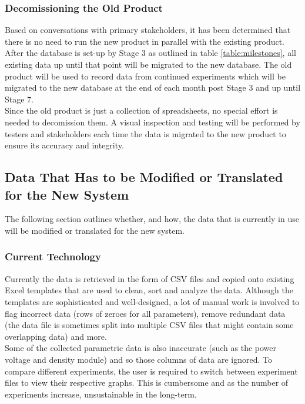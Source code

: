 \documentclass[12pt]{article}
\begin{document}
\subsubsection{Decomissioning the Old Product}
Based on conversations with primary stakeholders, it has been determined that there is no need to run the new product in parallel with the existing product. After the database is set-up
by Stage 3 as outlined in table \ref{table:milestones}, all existing data up until that point will be migrated to the new database. The old product will be used to record data from continued experiments
which will be migrated to the new database at the end of each month post Stage 3 and up until Stage 7.\\
\newline
Since the old product is just a collection of spreadsheets, no special effort is needed to decomission them. A visual inspection and testing will be performed by testers and stakeholders 
each time the data is migrated to the new product to ensure its accuracy and integrity.

\subsection{Data That Has to be Modified or Translated for the New System}
The following section outlines whether, and how, the data that is currently in use will be modified or translated for the new system.
\subsubsection{Current Technology}
Currently the data is retrieved in the form of CSV files and copied onto existing Excel templates that are used to clean, sort and analyze 
the data. Although the templates are sophisticated and well-designed, a lot of manual work is involved to flag incorrect data (rows of zeroes for 
all parameters), remove redundant data (the data file is sometimes split into multiple CSV files that might contain some overlapping data) and more.\\
\newline
Some of the collected parametric data is also inaccurate (such as the power voltage and density module) and so those columns of data are ignored.
To compare different experiments, the user is required to switch between experiment files to view their respective graphs. This is cumbersome and as 
the number of experiments increase, unsustainable in the long-term.
\end{document}
